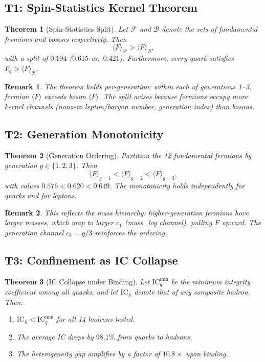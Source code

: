 \documentclass[
  aps,
  prd,
  twocolumn,
  superscriptaddress,
  nofootinbib,
  floatfix
]{revtex4-2}
\newtheorem{theorem}{Theorem}
\newtheorem{remark}{Remark}
\newcommand{\beq}{\begin{equation}}
\newcommand{\eeq}{\end{equation}}
\newcommand{\IC}{\mathrm{IC}}
\begin{document}
\subsection{T1: Spin-Statistics Kernel Theorem}

\begin{theorem}[Spin-Statistics Split]\label{thm:T1}
Let $\mathcal{F}$ and $\mathcal{B}$ denote the sets of
fundamental fermions and bosons respectively.  Then
\beq
  \langle F \rangle_{\mathcal{F}} > \langle F \rangle_{\mathcal{B}},
\eeq
with a split of $0.194$ ($0.615$ vs.\ $0.421$).  Furthermore,
every quark satisfies $F_q > \langle F \rangle_{\mathcal{B}}$.
\end{theorem}

\begin{remark}
The theorem holds per-generation: within each of generations 1--3,
fermion $\langle F \rangle$ exceeds boson $\langle F \rangle$.
The split arises because fermions occupy more kernel channels
(nonzero lepton/baryon number, generation index) than bosons.
\end{remark}

\subsection{T2: Generation Monotonicity}

\begin{theorem}[Generation Ordering]\label{thm:T2}
Partition the 12 fundamental fermions by generation $g \in \{1,2,3\}$.
Then
\beq
  \langle F \rangle_{g=1} < \langle F \rangle_{g=2} < \langle F \rangle_{g=3},
\eeq
with values $0.576 < 0.620 < 0.649$.  The monotonicity holds
independently for quarks and for leptons.
\end{theorem}

\begin{remark}
This reflects the mass hierarchy: higher-generation fermions
have larger masses, which map to larger $c_1$ (mass\_log channel),
pulling $F$ upward.  The generation channel $c_8 = g/3$ reinforces
the ordering.
\end{remark}

\subsection{T3: Confinement as IC Collapse}

\begin{theorem}[IC Collapse under Binding]\label{thm:T3}
Let $\IC_q^{\min}$ be the minimum integrity coefficient among
all quarks, and let $\IC_h$ denote that of any composite hadron.
Then:
\begin{enumerate}
\item $\IC_h < \IC_q^{\min}$ for all 14 hadrons tested.
\item The average IC drops by $98.1\%$ from quarks to hadrons.
\item The heterogeneity gap amplifies by a factor of $10.8\times$ upon
      binding.
\end{enumerate}
\end{theorem}
\end{document}
